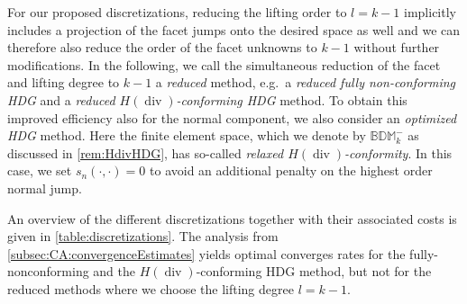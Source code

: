 \documentclass{m2an}
\renewcommand{\div}{\operatorname{div}}
\theoremstyle{plain}
\theoremstyle{definition}
\begin{document}
For our proposed discretizations, reducing the lifting order to $l=k-1$ implicitly includes a projection of the facet jumps onto the desired space as well and we can therefore also reduce the order of the facet unknowns to $k-1$ without further modifications. In the following, we call the simultaneous reduction of the facet and lifting degree to $k-1$ a \emph{reduced} method, e.g.~a \emph{reduced fully non-conforming HDG} and a \emph{reduced $H(\div)$-conforming HDG} method.
%
To obtain this improved efficiency also for the normal component, we also consider an \emph{optimized HDG} method. Here the finite element space, which we denote by $\mathbb{BDM}_{k}^{-}$ as discussed in \cref{rem:HdivHDG}, has so-called \emph{relaxed $H(\div)$-conformity}. In this case, we set $s_n(\cdot,\cdot) = 0$ to avoid an additional penalty on the highest order normal jump. 

An overview of the different discretizations together with their associated costs is given in \cref{table:discretizations}. The analysis from \cref{subsec:CA:convergenceEstimates} yields optimal converges rates for the fully-nonconforming and the $H(\div)$-conforming HDG method, but not for the reduced methods where we choose the lifting degree $l = k-1$.  
\end{document}
